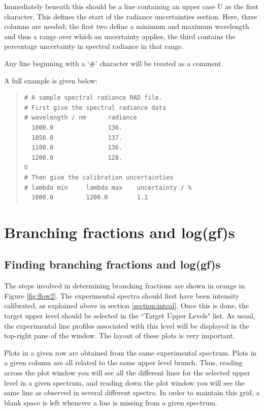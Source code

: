\documentclass[a4paper,12pt]{report}
\begin{document}
Immediately beneath this should be a line containing an upper case U as the first character. This defines the start of the radiance uncertainties section. Here, three columns are needed; the first two define a minimum and maximum wavelength and thus a range over which an uncertainty applies, the third contains the percentage uncertainty in spectral radiance in that range.

Any line beginning with a `\#' character will be treated as a comment.

A full example is given below:

\begin{quote}
\begin{verbatim}
# A sample spectral radiance RAD file.
# First give the spectral radiance data
# wavelength / nm      radiance
  1000.0               136.
  1050.0               137.
  1100.0               136.
  1200.0               128.
U
# Then give the calibration uncertainties
# lambda min     lambda max    uncertainty / %
  1000.0         1200.0        1.1
\end{verbatim}
\end{quote}

\section{Branching fractions and log(gf)s}
\subsection{Finding branching fractions and log(gf)s}
\label{section:calcbf}
The steps involved in determining branching fractions are shown in orange in Figure \ref{fig:flow2}. The experimental spectra should first have been intensity calibrated, as explained above in section \ref{section:intcal}. Once this is done, the target upper level should be selected in the ``Target Upper Levels" list. As usual, the experimental line profiles associated with this level will be displayed in the top-right pane of the window. The layout of these plots is very important.

Plots in a given row are obtained from the same experimental spectrum. Plots in a given column are all related to the same upper level branch. Thus, reading across the plot window you will see all the different lines for the selected upper level in a given spectrum, and reading down the plot window you will see the same line as observed in several different spectra. In order to maintain this grid, a blank space is left whenever a line is missing from a given spectrum.
\end{document}
